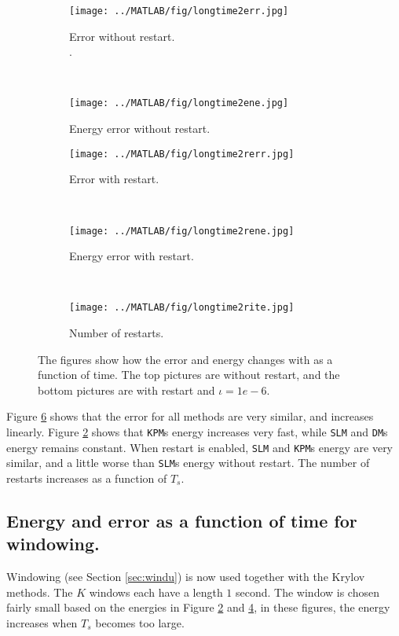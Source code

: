 \begin{figure}[H]
        \centering
        \begin{subfigure}[b]{0.3\textwidth}
                \texttt{[image: ../MATLAB/fig/longtime2err.jpg]}
                \caption{ Error without restart. \\. }
                \label{fig:longtime2err}
        \end{subfigure}
        ~
        \begin{subfigure}[b]{0.3\textwidth}
                \texttt{[image: ../MATLAB/fig/longtime2ene.jpg]}
                \caption{ Energy error without restart. }
                \label{fig:longtime8err}
        \end{subfigure}
        
        \begin{subfigure}[b]{0.3\textwidth}
                \texttt{[image: ../MATLAB/fig/longtime2rerr.jpg]}
                \caption{ Error with restart. }
                \label{fig:longtime2rerr}
        \end{subfigure}
        ~
        \begin{subfigure}[b]{0.3\textwidth}
                \texttt{[image: ../MATLAB/fig/longtime2rene.jpg]}
                \caption{ Energy error with restart. }
                \label{fig:longtime8rerr}
        \end{subfigure}
        ~
        \begin{subfigure}[b]{0.3\textwidth}
                \texttt{[image: ../MATLAB/fig/longtime2rite.jpg]}
                \caption{ Number of restarts. }
                \label{fig:longtime2rene}
        \end{subfigure}
        \caption{ The figures show how the error and energy changes with as a function of time. The top pictures are without restart, and the bottom pictures are with restart and $\iota = 1e-6$. }
        \label{fig:SLMenergyerror0}
\end{figure}
\noindent Figure \ref{fig:SLMenergyerror0} shows that the error for all methods are very similar, and increases linearly. Figure \ref{fig:longtime8err} shows that \texttt{KPM}s energy increases very fast, while \texttt{SLM} and \texttt{DM}s energy remains constant. When restart is enabled, \texttt{SLM} and \texttt{KPM}s energy are very similar, and a little worse than \texttt{SLM}s energy without restart. The number of restarts increases as a function of $T_s$. 
\subsection{Energy and error as a function of time for windowing.} %
Windowing (see Section \ref{sec:windu}) is now used together with the Krylov methods. The $K$ windows each have a length $1$ second. The window is chosen fairly small based on the energies in Figure \ref{fig:longtime8err} and \ref{fig:longtime8rerr}, in these figures, the energy increases when $T_s$ becomes too large.

